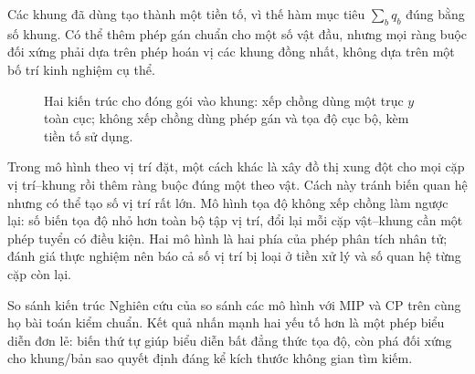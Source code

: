 Các khung đã dùng tạo thành một tiền tố, vì thế hàm mục tiêu \(\sum_bq_b\)
đúng bằng số khung. Có thể thêm phép gán chuẩn cho một số vật đầu, nhưng mọi
ràng buộc đối xứng phải dựa trên phép hoán vị các khung đồng nhất, không dựa
trên một bố trí kinh nghiệm cụ thể.

\begin{figure}[tb]
\centering
{}
\caption{Hai kiến trúc cho đóng gói vào khung: xếp chồng dùng một trục \(y\)
toàn cục; không xếp chồng dùng phép gán và tọa độ cục bộ, kèm tiền tố sử dụng.}
\label{fig:stacking-nonstacking}
\end{figure}

Trong mô hình theo vị trí đặt, một cách khác là xây đồ thị xung đột cho mọi cặp
vị trí--khung rồi thêm ràng buộc đúng một theo vật. Cách này tránh biến quan hệ
nhưng có thể tạo số vị trí rất lớn. Mô hình tọa độ không xếp chồng làm ngược
lại: số biến tọa độ nhỏ hơn toàn bộ tập vị trí, đổi lại mỗi cặp vật--khung cần
một phép tuyển có điều kiện. Hai mô hình là hai phía của phép phân tích nhân
tử; đánh giá thực nghiệm nên báo cả số vị trí bị loại ở tiền xử lý và số quan
hệ từng cặp còn lại.

\begin{resultbox}{So sánh kiến trúc}
Nghiên cứu của \textcite{kieu2025bin} so sánh các mô hình \SAT với MIP và CP
trên cùng họ bài toán kiểm chuẩn. Kết quả nhấn mạnh hai yếu tố hơn là một phép
biểu diễn đơn lẻ: biến thứ tự giúp biểu diễn bất đẳng thức tọa độ, còn phá đối
xứng cho khung/bản sao quyết định đáng kể kích thước không gian tìm kiếm.
\end{resultbox}

